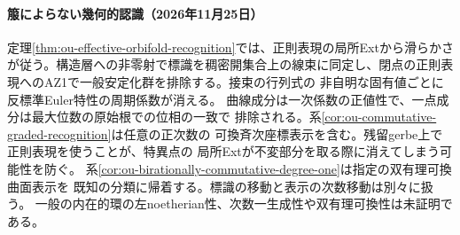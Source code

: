 \documentclass[11pt,a4paper]{ltjsarticle}
\begin{document}
\paragraph{箙によらない幾何的認識（2026年11月25日）}
定理\ref{thm:ou-effective-orbifold-recognition}では、正則表現の局所Extから滑らかさが従う。構造層への非零射で標識を稠密開集合上の線束に同定し、閉点の正則表現へのAZ1で一般安定化群を排除する。接束の行列式の
非自明な固有値ごとに反標準Euler特性の周期係数が消える。
曲線成分は一次係数の正値性で、一点成分は最大位数の原始根での位相の一致で
排除される。系\ref{cor:ou-commutative-graded-recognition}は任意の正次数の
可換斉次座標表示を含む。残留gerbe上で正則表現を使うことが、特異点の
局所Extが不変部分を取る際に消えてしまう可能性を防ぐ。
系\ref{cor:ou-birationally-commutative-degree-one}は指定の双有理可換曲面表示を
既知の分類に帰着する。標識の移動と表示の次数移動は別々に扱う。
一般の内在的環の左noetherian性、次数一生成性や双有理可換性は未証明である。
\end{document}
